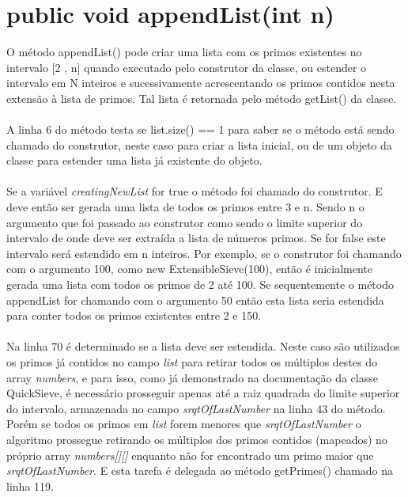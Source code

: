 \documentclass[a4paper,12pt,openany]{book}
\begin{document}
\section*{public void appendList(int n)}
\label{metodo:appendList()}

O método appendList() pode criar uma lista com os primos existentes no intervalo [2 , n] quando executado pelo construtor da classe, ou estender o intervalo em N inteiros e sucessivamente acrescentando os primos contidos nesta extensão à lista de primos. Tal lista é retornada pelo método getList() da classe.
\\
\\
A linha 6 do método testa se list.size() == 1 para saber se o método está sendo chamado do construtor, neste caso para criar a lista inicial, ou de um objeto da classe para estender uma lista já existente do objeto. 
\\
\\
Se a variável \textit{creatingNewList} for true o método foi chamado do construtor. E deve então ser gerada uma lista de todos os primos entre 3 e n. Sendo n o argumento que foi passado ao construtor como sendo o limite superior do intervalo de onde deve ser extraída a lista de números primos. Se for false este intervalo será estendido em n inteiros. Por exemplo, se o construtor foi chamando com o argumento 100, como new ExtensibleSieve(100), então é inicialmente gerada uma lista com todos os primos de 2 até 100. Se sequentemente o método appendList for chamando com o argumento 50 então esta lista seria estendida para conter todos os primos existentes entre 2 e 150.
\\
\\
Na linha 70 é determinado se a lista deve ser estendida. Neste caso são utilizados os primos já contidos no campo \textit{list} para retirar todos os múltiplos destes do array \textit{numbers}, e para isso, como já demonstrado na documentação da classe QuickSieve,
é necessário prosseguir apenas até a raiz quadrada do limite superior do intervalo, armazenada no campo \textit{srqtOfLastNumber} na linha 43 do método. Porém se todos os primos em \textit{list} forem menores que \textit{srqtOfLastNumber} o algoritmo prossegue retirando os múltiplos dos primos contidos (mapeados) no próprio array\textit{ numbers[][]} enquanto não for encontrado um primo maior que \textit{srqtOfLastNumber}. E esta tarefa é delegada ao método getPrimes() chamado na linha 119.
\end{document}
